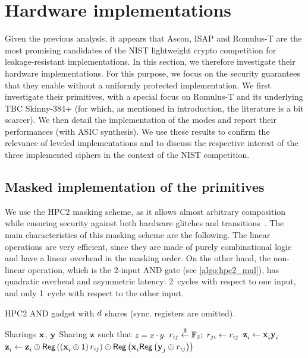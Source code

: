 \documentclass{llncs}
\begin{document}
\section{Hardware implementations}\label{sec:implem}

Given the previous analysis, it appears that Ascon, ISAP and Romulus-T are
the most promising candidates of the NIST lightweight crypto competition
for leakage-resistant implementations. In this section, we therefore investigate
their hardware implementations. For this purpose, we focus on
the security guarantees that they enable without a uniformly protected implementation.
We first investigate their primitives, with a special focus on Romulus-T
and its underlying TBC Skinny-384+ (for which, as mentioned in introduction,
the literature is a bit scarcer). We then detail the implementation of the
modes and report their performances (with ASIC synthesis). We use these results to confirm the
relevance of leveled implementations and to discuss the respective interest
of the three implemented ciphers in the context of the NIST competition.

\subsection{Masked implementation of the primitives}\label{subsec:prim}

We use the HPC2 masking scheme, as it allows almost arbitrary composition while
ensuring security against both hardware glitches and
transitions~\cite{DBLP:journals/tc/CassiersGLS21,DBLP:journals/tches/CassiersS21}.
The main characteristics of this masking scheme are the following.
The linear operations are very efficient, since they are made of purely
combinational logic and have a linear overhead in the masking order.
On the other hand, the non-linear operation, which is the 2-input AND gate (see
\autoref{algo:hpc2_mul}), has quadratic
overhead and asymmetric latency: 2~cycles with respect to one input, and only
1~cycle with respect to the other input.

\begin{algorithm}[tb]
    \caption{HPC2 AND gadget with $d$ shares (sync. registers
    are omitted).}
    \label{algo:hpc2_mul}
    \begin{algorithmic}[1]
        \Require Sharings $\mathbf{{x}}^{}$, $\mathbf{{y}}^{}$
        \Ensure Sharing $\mathbf{{z}}^{}$ such that $z = x \cdot y$.
        \algrule
                \State $r_{ij} \overset{\$}{\gets} \mathbb{F}_{2}; \ r_{ji} \gets r_{ij}$
            \EndFor
        \EndFor
            \State $\mathbf{{z}}^{}_{i} \gets \mathbf{{x}}^{}_{i}\mathbf{{y}}^{}_{i}$
                \State $\mathbf{{z}}^{}_{i} \gets
                \mathbf{{z}}^{}_{i} \oplus
                    \textsf{Reg}\left(\left(\mathbf{{x}}^{}_{i}\oplus 1\right) r_{ij}\right)
                    \oplus \textsf{Reg}\left(\mathbf{{x}}^{}_{i}\textsf{Reg}\left(\mathbf{{y}}^{}_{j}\oplus r_{ij}\right)\right)
                    $
            \EndFor
        \EndFor
    \end{algorithmic}
\end{algorithm}
\end{document}
